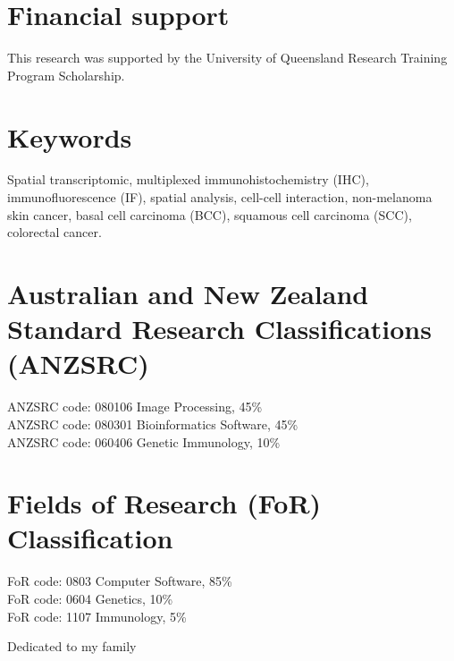 \section*{Financial support}
This research was supported by the University of Queensland Research Training Program Scholarship. 






\section*{Keywords}
Spatial transcriptomic, multiplexed immunohistochemistry (IHC), immunofluorescence (IF), spatial analysis, cell-cell interaction, non-melanoma skin cancer, basal cell carcinoma (BCC), squamous cell carcinoma (SCC), colorectal cancer.




\section*{Australian and New Zealand Standard Research Classifications (ANZSRC)}

ANZSRC code: 080106 Image Processing, 45\%  \\
ANZSRC code: 080301 Bioinformatics Software, 45\% \\ 
ANZSRC code: 060406 Genetic Immunology, 10\%

\section*{Fields of Research (FoR) Classification}

FoR code: 0803 Computer Software, 85\% \\
FoR code: 0604 Genetics, 10\% \\
FoR code: 1107 Immunology, 5\%


\clearpage
Dedicated to my family


\pagebreak
\pagestyle{headings}


\clearpage
\tableofcontents
	\clearpage
\listoffigures
	\clearpage
\listoftables
\newpage
